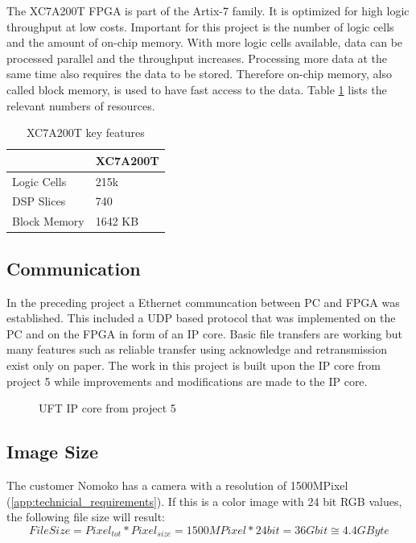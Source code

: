 The XC7A200T FPGA is part of the Artix-7 family. It is optimized for high logic
throughput at low costs. Important for this project is the number of logic cells
and the amount of on-chip memory. With more logic cells available, data can be
processed parallel and the throughput increases. Processing more data at the
same time also requires the data to be stored. Therefore on-chip memory, also
called block memory, is used to have fast access to the data. Table 
\ref{tab:XC7A200T} lists the relevant numbers of resources.

\begin{table}[tb!]
    \centering
    \begin{tabular}{l l}
        \toprule
         & XC7A200T \\
        \midrule
        Logic Cells & 215k \\
        DSP Slices & 740 \\
        Block Memory & 1642 KB \\
        \bottomrule
    \end{tabular}
    \caption{XC7A200T key features \cite{xilinx_ac701}}
    \label{tab:XC7A200T}
\end{table}


\subsection{Communication} \label{chapt:mission:communication} 
In the preceding project \cite{p5report} a Ethernet communcation between PC and
FPGA was established. This included a UDP based protocol that was implemented on
the PC and on the FPGA in form of an IP core. Basic file transfers are working
but many features such as reliable transfer using acknowledge and retransmission
exist only on paper. The work in this project is built
upon the IP core from project 5 while improvements and modifications are made to
the IP core.

\begin{figure}[tb!]
    \centering
    \caption{UFT IP core from project 5 \cite{p5report}}
    \label{fig:uftipcorep5}
\end{figure}


\subsection{Image Size}
The customer Nomoko has a camera with a resolution of 1500MPixel (\ref{app:technicial_requirements}). If this is a color image with 24 bit RGB values, the following file size will result:
\begin{equation}
    File Size = Pixel_{tot} * Pixel_{size} = 1500MPixel * 24bit = 36Gbit \cong 4.4GByte
    \label{eq:filesize}
\end{equation}

